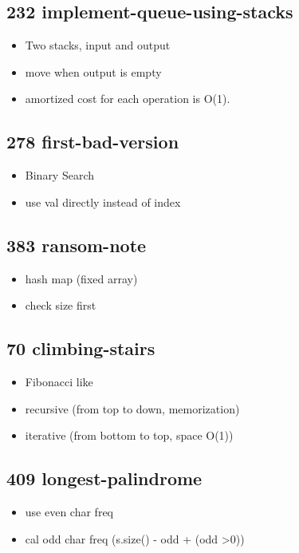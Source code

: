 \subsection{232 implement-queue-using-stacks}

\begin{itemize}
	\item Two stacks, input and output
	\item move when output is empty
	\item amortized cost for each operation is O(1).
\end{itemize}

\subsection{278 first-bad-version}

\begin{itemize}
	\item Binary Search
	\item use val directly instead of index
\end{itemize}

\subsection{383 ransom-note}

\begin{itemize}
	\item hash map (fixed array)
	\item check size first
\end{itemize}

\subsection{70 climbing-stairs}

\begin{itemize}
	\item Fibonacci like
	\item recursive (from top to down, memorization)
	\item iterative (from bottom to top, space O(1))
\end{itemize}

\subsection{409 longest-palindrome}

\begin{itemize}
	\item use even char freq
	\item cal odd char freq (s.size() - odd + (odd >0))
\end{itemize}

